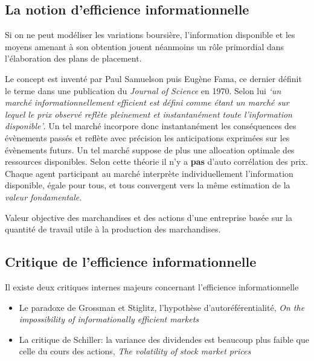 \documentclass[main.tex]{subfiles}
\begin{document}
\subsection{La notion d'efficience informationnelle}
Si on ne peut modéliser les variations boursière, l'information disponible et les moyens amenant à son obtention jouent néanmoins un rôle primordial dans l'élaboration des plans de placement. 

\begin{definition}
        Le concept est inventé par Paul Samuelson puis Eugène Fama, ce dernier définit le terme dans une publication du \textit{Journal of Science} en 1970. Selon lui \textit{`un marché informationnellement efficient est défini comme étant un marché sur lequel le prix observé reflète pleinement et instantanément toute l'information disponible'}. Un tel marché incorpore donc instantanément les conséquences des évènements passés et reflète avec précision les anticipations exprimées sur les évènements futurs. Un tel marché suppose de plus une allocation optimale des ressources disponibles. Selon cette théorie il n'y a \textbf{pas} d'auto corrélation des prix. Chaque agent participant au marché interprète individuellement l'information disponible, égale pour tous, et tous convergent vers la même estimation de la \emph{valeur fondamentale}.
\end{definition}

\begin{definition}
        Valeur objective des marchandises et des actions d'une entreprise basée sur la quantité de travail utile à la production des marchandises.
\end{definition}
        
\subsection{Critique de l'efficience informationnelle}

Il existe deux critiques internes majeurs concernant l'efficience informationnelle
\begin{itemize}
        \item Le paradoxe de Grossman et Stiglitz, l'hypothèse d'autoréférentialité, \textit{On the impossibility of informationally efficient markets}
        \item La critique de Schiller: la variance des dividendes est beaucoup plus faible que celle du cours des actions, \textit{The volatility of stock market prices}
\end{itemize}
\end{document}
